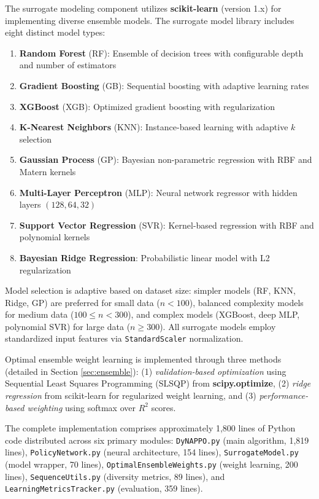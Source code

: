 The surrogate modeling component utilizes \textbf{scikit-learn} (version 1.x) for implementing diverse ensemble models. The surrogate model library includes eight distinct model types:
\begin{enumerate}
    \item \textbf{Random Forest} (RF): Ensemble of decision trees with configurable depth and number of estimators
    \item \textbf{Gradient Boosting} (GB): Sequential boosting with adaptive learning rates
    \item \textbf{XGBoost} (XGB): Optimized gradient boosting with regularization
    \item \textbf{K-Nearest Neighbors} (KNN): Instance-based learning with adaptive $k$ selection
    \item \textbf{Gaussian Process} (GP): Bayesian non-parametric regression with RBF and Matern kernels
    \item \textbf{Multi-Layer Perceptron} (MLP): Neural network regressor with hidden layers $(128, 64, 32)$
    \item \textbf{Support Vector Regression} (SVR): Kernel-based regression with RBF and polynomial kernels
    \item \textbf{Bayesian Ridge Regression}: Probabilistic linear model with L2 regularization
\end{enumerate}

Model selection is adaptive based on dataset size: simpler models (RF, KNN, Ridge, GP) are preferred for small data ($n < 100$), balanced complexity models for medium data ($100 \leq n < 300$), and complex models (XGBoost, deep MLP, polynomial SVR) for large data ($n \geq 300$). All surrogate models employ standardized input features via \texttt{StandardScaler} normalization.

Optimal ensemble weight learning is implemented through three methods (detailed in Section \ref{sec:ensemble}): (1) \textit{validation-based optimization} using Sequential Least Squares Programming (SLSQP) from \textbf{scipy.optimize}, (2) \textit{ridge regression} from scikit-learn for regularized weight learning, and (3) \textit{performance-based weighting} using softmax over $R^2$ scores.

The complete implementation comprises approximately 1,800 lines of Python code distributed across six primary modules: \texttt{DyNAPPO.py} (main algorithm, 1,819 lines), \texttt{PolicyNetwork.py} (neural architecture, 154 lines), \texttt{SurrogateModel.py} (model wrapper, 70 lines), \texttt{OptimalEnsembleWeights.py} (weight learning, 200 lines), \texttt{SequenceUtils.py} (diversity metrics, 89 lines), and \texttt{LearningMetricsTracker.py} (evaluation, 359 lines).

